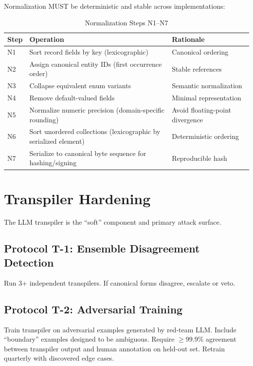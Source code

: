 \documentclass[11pt,letterpaper]{article}
\theoremstyle{definition}
\theoremstyle{remark}
\begin{document}
Normalization MUST be deterministic and stable across implementations:

\begin{table}[h]
\centering
\begin{tabular}{@{}lll@{}}
\toprule
\textbf{Step} & \textbf{Operation} & \textbf{Rationale} \\
\midrule
N1 & Sort record fields by key (lexicographic) & Canonical ordering \\
N2 & Assign canonical entity IDs (first occurrence order) & Stable references \\
N3 & Collapse equivalent enum variants & Semantic normalization \\
N4 & Remove default-valued fields & Minimal representation \\
N5 & Normalize numeric precision (domain-specific rounding) & Avoid floating-point divergence \\
N6 & Sort unordered collections (lexicographic by serialized element) & Deterministic ordering \\
N7 & Serialize to canonical byte sequence for hashing/signing & Reproducible hash \\
\bottomrule
\end{tabular}
\caption{Normalization Steps N1--N7}
\end{table}


\section{Transpiler Hardening}

The LLM transpiler is the ``soft'' component and primary attack surface.

\subsection{Protocol T-1: Ensemble Disagreement Detection}

Run 3+ independent transpilers. If canonical forms disagree, escalate or veto.

\subsection{Protocol T-2: Adversarial Training}

Train transpiler on adversarial examples generated by red-team LLM. Include ``boundary'' examples designed to be ambiguous. Require $\geq$99.9\% agreement between transpiler output and human annotation on held-out set. Retrain quarterly with discovered edge cases.
\end{document}
